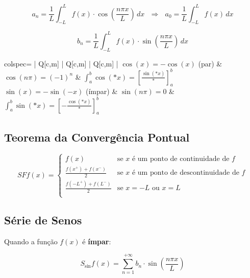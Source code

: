 \documentclass[11pt, a4paper]{article}
\begin{document}
\begin{equation*}
    a_n =
    \frac{1}{L} \int_{-L}^{L} f(x) \cdot \cos\left(\frac{n\pi x}{L}\right) \, dx
    \ \ \ \Rightarrow \ \ \
    a_0 =
    \frac{1}{L} \int_{-L}^{L} f(x) \, dx
\end{equation*}

\begin{equation*}
    b_n =
    \frac{1}{L} \int_{-L}^{L} f(x) \cdot \sin\left(\frac{n\pi x}{L}\right) \, dx
\end{equation*}

\begin{center}
    \begin{tblr}[T]{colspec={ | Q[c,m] | Q[c,m] | Q[c,m] | }}
        \hline
        $\cos(x) = - \cos(x)$ (par)    &
        $\cos(n\pi) = (-1)^n$          &
        $\displaystyle \int_a^b \cos(*x) = \left[\frac{\sin(*x)}{*}\right]_a^b$ \\\hline
        $\sin(x) = - \sin(-x)$ (ímpar) &
        $\sin(n\pi) = 0$               &
        $\displaystyle \int_a^b \sin(*x) = \left[-\frac{\cos(*x)}{*}\right]_a^b$
        \\\hline
    \end{tblr}
\end{center}

\subsection{Teorema da Convergência Pontual}

\begin{equation*}
    SFf(x) =
    \begin{cases}
        f(x)                     & \text{se $x$ é um ponto de continuidade de $f$}    \\
        \frac{f(x^+)+f(x^-)}{2}  & \text{se $x$ é um ponto de descontinuidade de $f$} \\
        \frac{f(-L^+)+f(L^-)}{2} & \text{se $x = -L$ ou $x = L$}                      \\
    \end{cases}
\end{equation*}

\subsection{Série de Senos}

Quando a função $f(x)$ é \textbf{ímpar}:

\begin{equation*}
    S_{\sin} f(x) =
    \sum_{n=1}^{+\infty}b_n \cdot \sin\left(\frac{n\pi x}{L}\right)
\end{equation*}
\end{document}
